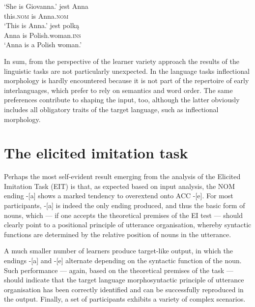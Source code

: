 \ea%
    \label{ex:08:8}
    \glt    ‘She is Giovanna.’
    \ex\label{ex:08:8b}
        {jest}  {Anna}\\
            this\textsc{.nom}  is  Anna\textsc{.nom}\\
     \glt    ‘This is Anna.’
    \ex\label{ex:08:8c}
      {jest}  {polką}\\
            Anna  is  Polish.woman\textsc{.ins}\\
     \glt    ‘Anna is a Polish woman.’
    \z
\z

In sum, from the perspective of the learner variety approach the results of the linguistic tasks are not particularly unexpected. In the language tasks inflectional morphology is hardly encountered because it is not part of the repertoire of early interlanguages, which prefer to rely on semantics and word order. The same preferences contribute to shaping the input, too, although the latter obviously includes all obligatory traits of the target language, such as inflectional morphology. 

\section{The elicited imitation task}\label{sec:08:2}

Perhaps the most self-evident result emerging from the analysis of the Elicited Imitation Task (EIT) is that, as expected based on input analysis, the NOM ending -[a] shows a marked tendency to overextend onto ACC -[e]. For most participants, -[a] is indeed the only ending produced, and thus the basic form of nouns, which — if one accepts the theoretical premises of the EI test — should clearly point to a positional principle of utterance organisation, whereby syntactic functions are determined by the relative position of nouns in the utterance.

A much smaller number of learners produce target-like output, in which the endings -[a] and -[e] alternate depending on the syntactic function of the noun. Such performance — again, based on the theoretical premises of the task — should indicate that the target language morphosyntactic principle of utterance organisation has been correctly identified and can be successfully reproduced in the output. Finally, a set of participants exhibits a variety of complex scenarios. 

